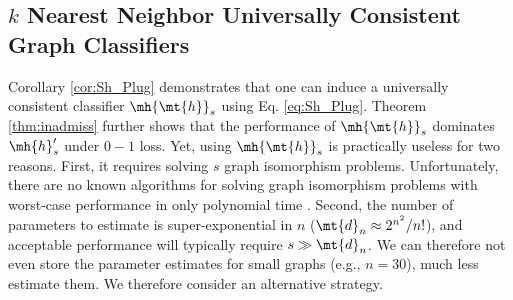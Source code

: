 \documentclass[10pt,journal,cspaper,compsoc]{IEEEtran}
\begin{document}



\subsection{$k$ Nearest Neighbor Universally Consistent Graph Classifiers} %
\label{sec:a_practical_approach_to_unlabeled_graph_classification}


Corollary \ref{cor:Sh_Plug} demonstrates that one can induce a universally consistent classifier $\mh{\mt{h}}_s$  using Eq. \eqref{eq:Sh_Plug}. Theorem \ref{thm:inadmiss} further shows that the performance of $\mh{\mt{h}}_s$ dominates $\mh{h}_s'$ under $0-1$ loss.  Yet, using $\mh{\mt{h}}_s$ is practically useless for two reasons.  First, it requires solving $s$ graph isomorphism problems. Unfortunately, there are no known algorithms for solving graph isomorphism problems with worst-case performance in only polynomial time \cite{Fortin1996}. Second, the number of parameters to estimate is super-exponential in $n$ ($\mt{d}_n \approx 2^{n^2}/n!$), and acceptable performance will typically require $s \gg \mt{d}_n$.  We can therefore not even store the parameter estimates for small graphs (e.g., $n=30$), much less estimate them.  
We therefore consider an alternative strategy.
\end{document}
